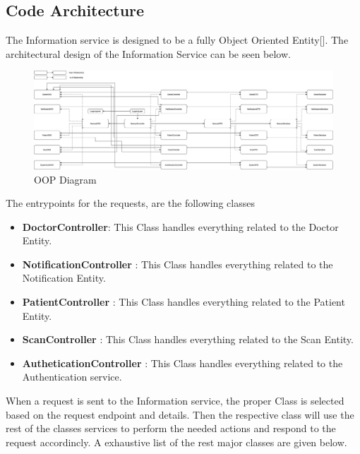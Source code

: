 		\subsection{Code Architecture}
			The Information service is designed to be a fully Object Oriented Entity[\cite{oop}].
			The architectural design of the Information Service can be seen below.\pagebreak
			\begin{figure}[H]
				\iftrue
				\caption{OOP Diagram}
				\centering
				 \includegraphics[angle=90,origin=c,scale=0.3]{figures/InformationServiceArchitecture}
				\fi
			\end{figure}\pagebreak
			The entrypoints for the requests, are the following classes
			\begin{itemize}
				\item \textbf{DoctorController}: This Class handles everything related to the Doctor Entity.
				\item \textbf{NotificationController} : This Class handles everything related to the Notification Entity.
				\item \textbf{PatientController} : This Class handles everything related to the Patient Entity.
				\item \textbf{ScanController} : This Class handles everything related to the Scan Entity.
				\item \textbf{AutheticationController} : This Class handles everything related to the Authentication service.
			\end{itemize}
			When a request is sent to the Information service, the proper Class is selected based on the request endpoint and details. 
			Then the respective class will use the rest of the classes services to perform the needed actions and respond to the request
			accordincly. A exhaustive list of the rest major classes are given below.
